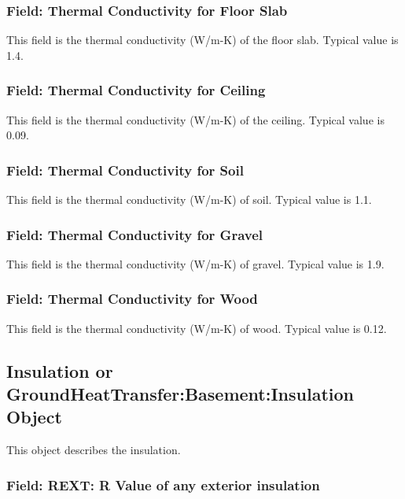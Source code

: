 \subsubsection{Field: Thermal Conductivity for Floor Slab}\label{field-thermal-conductivity-for-floor-slab}

This field is the thermal conductivity (W/m-K) of the floor slab. Typical value is 1.4.

\subsubsection{Field: Thermal Conductivity for Ceiling}\label{field-thermal-conductivity-for-ceiling}

This field is the thermal conductivity (W/m-K) of the ceiling. Typical value is 0.09.

\subsubsection{Field: Thermal Conductivity for Soil}\label{field-thermal-conductivity-for-soil}

This field is the thermal conductivity (W/m-K) of soil. Typical value is 1.1.

\subsubsection{Field: Thermal Conductivity for Gravel}\label{field-thermal-conductivity-for-gravel}

This field is the thermal conductivity (W/m-K) of gravel. Typical value is 1.9.

\subsubsection{Field: Thermal Conductivity for Wood}\label{field-thermal-conductivity-for-wood}

This field is the thermal conductivity (W/m-K) of wood. Typical value is 0.12.

\subsection{Insulation or GroundHeatTransfer:Basement:Insulation Object}\label{insulation-or-groundheattransferbasementinsulation-object}

This object describes the insulation.

\subsubsection{Field: REXT: R Value of any exterior insulation}\label{field-rext-r-value-of-any-exterior-insulation}


